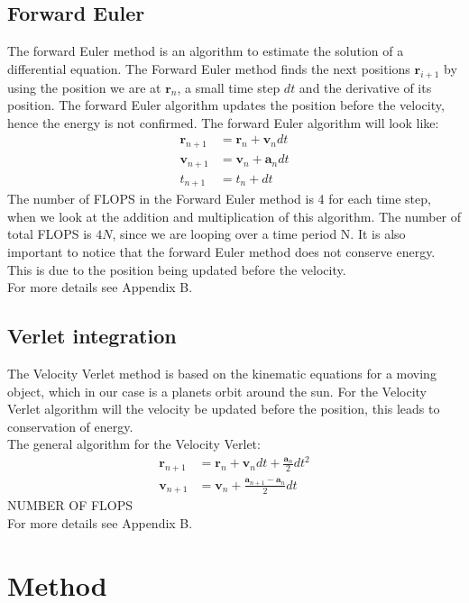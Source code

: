 \documentclass{article}
\begin{document}
\begin{multicols}{2}
\subsection{Forward Euler}
The forward Euler method is an algorithm to estimate the solution of a differential equation. The Forward Euler method  finds the next positions $\mathbf{r}_{i+1}$ by using the position we are at $\mathbf{r}_{n}$, a small time step $dt$ and the derivative of its position. The forward Euler algorithm updates the position before the velocity, hence the energy is not confirmed. 
The forward Euler algorithm will look like:
\begin{align*}
    \mathbf{r}_{n+1}&=\mathbf{r}_n+\mathbf{v}_ndt\\
    \mathbf{v}_{n+1}&=\mathbf{v}_n+\mathbf{a}_ndt\\
    t_{n+1}&=t_n + dt
\end{align*}
The number of FLOPS in the Forward Euler method is 4 for each time step, when we look at the addition and multiplication of this algorithm. The number of total FLOPS is $4N$, since we are looping over a time period N. It is also important to notice that the forward Euler method does not conserve energy. This is due to the position being updated before the velocity.  \\
For more details see Appendix B.
\\
\subsection{Verlet integration}
The Velocity Verlet method is based on the kinematic equations for a moving object, which in our case is a planets orbit around the sun. For the Velocity Verlet algorithm will the velocity be updated before the position, this leads to conservation of energy.\\   
The general algorithm for the Velocity Verlet:
\begin{align*}
    \mathbf{r}_{n+1}&=\mathbf{r}_n+\mathbf{v}_ndt+\frac{\mathbf{a}_n}{2}dt^2\\
    \mathbf{v}_{n+1}&=\mathbf{v}_n+\frac{\mathbf{a}_{n+1}-\mathbf{a}_n}{2}dt
\end{align*}
NUMBER OF FLOPS\\
For more details see Appendix B.

\section{Method}



\end{multicols}
\end{document}

